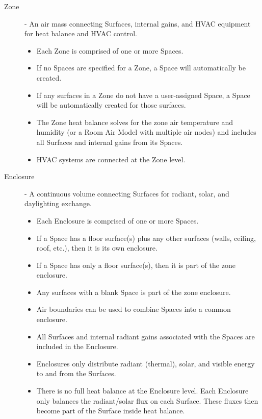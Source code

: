 \begin{description}
  \item[Zone] - An air mass connecting Surfaces, internal gains, and HVAC equipment for heat balance and HVAC control.
  \begin{itemize}
    \item
     Each Zone is comprised of one or more Spaces.
    \item
     If no Spaces are specified for a Zone, a Space will automatically be created.
    \item
     If any surfaces in a Zone do not have a user-assigned Space, a Space will be automatically created for those surfaces.
    \item
     The Zone heat balance solves for the zone air temperature and humidity (or a Room Air Model with multiple air nodes) and includes all Surfaces and internal gains from its Spaces.
    \item
     HVAC systems are connected at the Zone level.
  \end{itemize}

  \item[Enclosure] - A continuous volume connecting Surfaces for radiant, solar, and daylighting exchange.
  \begin{itemize}
    \item
     Each Enclosure is comprised of one or more Spaces.
    \item
     If a Space has a floor surface(s) plus any other surfaces (walls, ceiling, roof, etc.), then it is its own enclosure.
    \item
     If a Space has only a floor surface(s), then it is part of the zone enclosure.
    \item
     Any surfaces with a blank Space is part of the zone enclosure.
    \item
     Air boundaries can be used to combine Spaces into a common enclosure.
    \item
     All Surfaces and internal radiant gains associated with the Spaces are included in the Enclosure.
    \item
     Enclosures only distribute radiant (thermal), solar, and visible energy to and from the Surfaces.
    \item
     There is no full heat balance at the Enclosure level. Each Enclosure only balances the radiant/solar flux on each Surface. These fluxes then become part of the Surface inside heat balance.
  \end{itemize}
\end{description}
